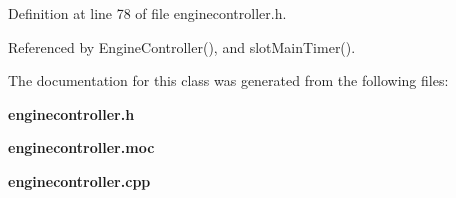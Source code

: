 Definition at line 78 of file enginecontroller.h.

Referenced by Engine\-Controller(), and slot\-Main\-Timer().

The documentation for this class was generated from the following files:\begin{CompactItemize}
\item 
{\bf enginecontroller.h}\item 
{\bf enginecontroller.moc}\item 
{\bf enginecontroller.cpp}\end{CompactItemize}
